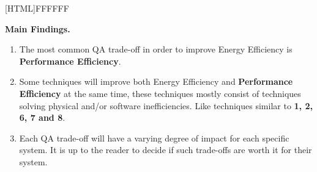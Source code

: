 \vspace{5mm}

\noindent{}[HTML]{FFFFFF}{\parbox{0.47\textwidth}{%
\noindent \textbf{Main Findings.}
\begin{enumerate}[nolistsep]
\item The most common QA trade-off in order to improve Energy Efficiency is \textbf{Performance Efficiency}.
\item Some techniques will improve both Energy Efficiency and \textbf{Performance Efficiency} at the same time, 
these techniques mostly consist of techniques solving physical and/or software inefficiencies.
Like techniques similar to \textbf{1, 2, 6, 7 and 8}.
\item Each QA trade-off will have a varying degree of impact for each specific system. 
It is up to the reader to decide if such trade-offs are worth it for their system.
\end{enumerate}}}
